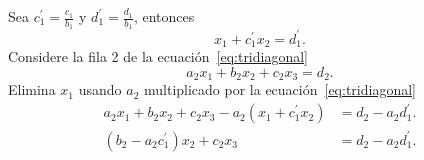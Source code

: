 \begin{frame}
	Sea $c^{\prime}_{1}=\frac{c_{1}}{b_{1}}$ y
	$d^{\prime}_{1}=\frac{d_{1}}{b_{1}}$, entonces
	\begin{equation*}
		x_{1}+
		c^{\prime}_{1}x_{2}=
		d^{\prime}_{1}.
	\end{equation*}
	Considere la fila 2 de la ecuación~\eqref{eq:tridiagonal}
	\begin{equation*}
		a_{2}x_{1}+
		b_{2}x_{2}+
		c_{2}x_{3}=
		d_{2}.
	\end{equation*}
	Elimina $x_{1}$ usando $a_{2}$ multiplicado por la ecuación~\eqref{eq:tridiagonal}
	\begin{align*}
		a_{2}x_{1}+
		b_{2}x_{2}+
		c_{2}x_{3}-
		a_{2}\left(x_{1}+c^{\prime}_{1}x_{2}\right)            & =
		d_{2}-a_{2}d^{\prime}_{1}.                                 \\
		\left(b_{2}-a_{2}c^{\prime}_{1}\right)x_{2}+c_{2}x_{3} & =
		d_{2}-a_{2}d^{\prime}_{1}.
	\end{align*}
\end{frame}

